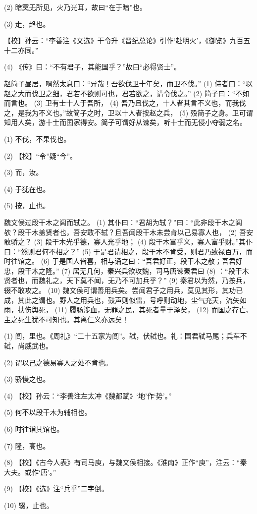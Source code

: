 \documentclass[12pt,UTF8]{ctexbook}
\begin{document}
(2) 暗冥无所见，火乃光耳，故曰“在于暗”也。

(3) 走，趋也。

【校】孙云：“李善注《文选》干令升《晋纪总论》引作‘赴明火’，《御览》九百五十二亦同。”

(4) 《传》曰：“不有君子，其能国乎？”故曰“必得贤士”。

赵简子昼居，喟然太息曰：“异哉！吾欲伐卫十年矣，而卫不伐。” (1) 侍者曰：“以赵之大而伐卫之细，君若不欲则可也，君若欲之，请令伐之。” (2) 简子曰：“不如而言也。 (3) 卫有士十人于吾所， (4) 吾乃且伐之，十人者其言不义也，而我伐之，是我为不义也。”故简子之时，卫以十人者按赵之兵， (5) 殁简子之身。卫可谓知用人矣，游十士而国家得安。简子可谓好从谏矣，听十士而无侵小夺弱之名。

(1) 不伐，不果伐也。

(2) 【校】“令”疑“今”。

(3) 而，汝。

(4) 于犹在也。

(5) 按，止也。

魏文侯过段干木之闾而轼之。 (1) 其仆曰：“君胡为轼？”曰：“此非段干木之闾欤？段干木盖贤者也，吾安敢不轼？且吾闻段干木未尝肯以己易寡人也， (2) 吾安敢骄之？ (3) 段干木光乎德，寡人光乎地； (4) 段干木富乎义，寡人富乎财。”其仆曰：“然则君何不相之？” (5) 于是君请相之，段干木不肯受，则君乃致禄百万，而时往馆之。 (6) 于是国人皆喜，相与诵之曰：“吾君好正，段干木之敬；吾君好忠，段干木之隆。” (7) 居无几何，秦兴兵欲攻魏，司马唐谏秦君曰 (8) ：“段干木贤者也，而魏礼之，天下莫不闻，无乃不可加兵乎？” (9) 秦君以为然，乃按兵，辍不敢攻之。 (10) 魏文侯可谓善用兵矣。尝闻君子之用兵，莫见其形，其功已成，其此之谓也。野人之用兵也，鼓声则似雷，号呼则动地，尘气充天，流矢如雨，扶伤舆死， (11) 履肠涉血，无罪之民，其死者量于泽矣， (12) 而国之存亡、主之死生犹不可知也。其离仁义亦远矣！

(1) 闾，里也。《周礼》“二十五家为闾”。轼，伏轼也。礼：国君轼马尾；兵车不轼，尚威武也。

(2) 谓以己之德易寡人之处不肯也。

(3) 骄慢之也。

(4) 【校】孙云：“李善注左太冲《魏都赋》‘地’作‘势’。”

(5) 何不以段干木为辅相也。

(6) 时往诣其馆也。

(7) 隆，高也。

(8) 【校】《古今人表》有司马庾，与魏文侯相接。《淮南》正作“庾”，注云：“秦大夫。或作‘唐’。”

(9) 【校】《选》注“兵乎”二字倒。

(10) 辍，止也。
\end{document}
